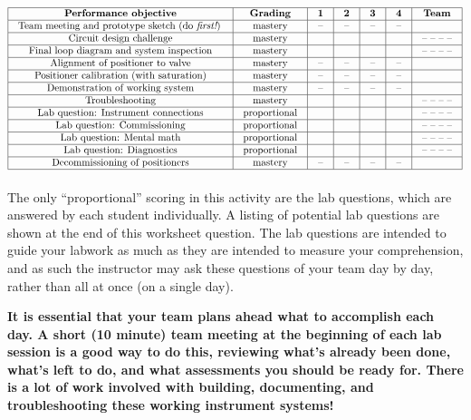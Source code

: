 \begin{itemize}


$$\vbox{\offinterlineskip
\halign{\strut
\vrule \quad\hfil # \ \hfil & 
\vrule \quad\hfil # \ \hfil & 
\vrule \quad\hfil # \ \hfil & 
\vrule \quad\hfil # \ \hfil & 
\vrule \quad\hfil # \ \hfil & 
\vrule \quad\hfil # \ \hfil & 
\vrule \quad\hfil # \ \hfil \vrule \cr
\noalign{\hrule}
%
{\bf Performance objective} & {\bf Grading} & {\bf 1} & {\bf 2} & {\bf 3} & {\bf 4} & {\bf Team} \cr
%
\noalign{\hrule}
%
Team meeting and prototype sketch (do {\it first!}) & mastery & -- & -- & -- & -- & \cr
%
\noalign{\hrule}
%
Circuit design challenge & mastery & & & & & -- -- -- -- \cr
%
\noalign{\hrule}
%
Final loop diagram and system inspection & mastery & & & & & -- -- -- -- \cr
%
\noalign{\hrule}
%
Alignment of positioner to valve & mastery & -- & -- & -- & -- & \cr
%
\noalign{\hrule}
%
Positioner calibration (with saturation) & mastery & -- & -- & -- & -- &  \cr
%
\noalign{\hrule}
%
Demonstration of working system & mastery & -- & -- & -- & -- & \cr
%
\noalign{\hrule}
%
Troubleshooting & mastery & & & & & -- -- -- -- \cr
%
\noalign{\hrule}
%
Lab question: Instrument connections & proportional &  &  &  &  & -- -- -- -- \cr
%
\noalign{\hrule}
%
Lab question: Commissioning & proportional &  &  &  &  & -- -- -- -- \cr
%
\noalign{\hrule}
%
Lab question: Mental math & proportional &  &  &  &  & -- -- -- -- \cr
%
\noalign{\hrule}
%
Lab question: Diagnostics & proportional &  &  &  &  & -- -- -- -- \cr
%
\noalign{\hrule}
%
Decommissioning of positioners & mastery & -- & -- & -- & -- &  \cr
%
\noalign{\hrule}
} %
}$$ %

The only ``proportional'' scoring in this activity are the lab questions, which are answered by each student individually.  A listing of potential lab questions are shown at the end of this worksheet question.  The lab questions are intended to guide your labwork as much as they are intended to measure your comprehension, and as such the instructor may ask these questions of your team day by day, rather than all at once (on a single day).


{\bf It is essential that your team plans ahead what to accomplish each day.  A short (10 minute) team meeting at the beginning of each lab session is a good way to do this, reviewing what's already been done, what's left to do, and what assessments you should be ready for.  There is a lot of work involved with building, documenting, and troubleshooting these working instrument systems!}


\end{itemize}
